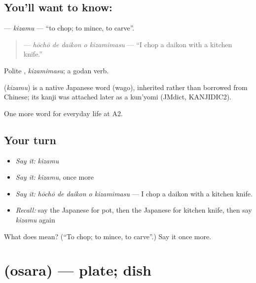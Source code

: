 \subsection*{You'll want to know: }
\textbf{} — \emph{kizamu} — \textquotedblleft{}to chop; to mince, to carve\textquotedblright{}.

\begin{quote}
\textbf{  } — \emph{hōchō de daikon o kizamimasu} — \textquotedblleft{}I chop a daikon with a kitchen knife.\textquotedblright{}
\end{quote}

Polite \textbf{}, \emph{kizamimasu}; a godan verb.

\begin{cousinweb}
\textbf{} (\emph{kizamu}) is a native Japanese word (wago), inherited rather than borrowed from Chinese; its kanji was attached later as a kun'yomi (JMdict, KANJIDIC2).
\end{cousinweb}

\begin{grammarlens}[title={What you've built}]
One more word for everyday life at A2.
\end{grammarlens}

\subsection*{Your turn}
\begin{itemize}
\raggedright
  \item \emph{Say it:} \emph{kizamu}
  \item \emph{Say it:} \emph{kizamu}, once more
  \item \emph{Say it:} \emph{hōchō de daikon o kizamimasu} — I chop a daikon with a kitchen knife.
  \item \emph{Recall:} say the Japanese for pot, then the Japanese for kitchen knife, then say \emph{kizamu} again
\end{itemize}

\begin{tcolorbox}[breakable,colback=teal!4,colframe=teal!35!black,title={Before you move on}]
What does  mean? (\textquotedblleft{}To chop; to mince, to carve\textquotedblright{}.) Say it once more.
\end{tcolorbox}
\section[\texorpdfstring{\ja{おさら} (osara)}{おさら (osara)}]{ (osara) — plate; dish}

